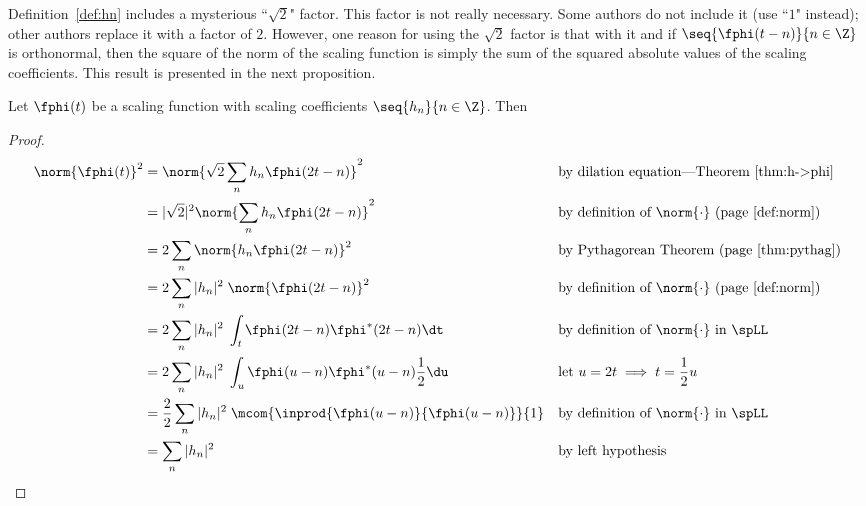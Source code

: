 Definition~\ref{def:hn} includes a mysterious ``$\sqrt{2}$" factor.
This factor is not really necessary.
Some authors do not include it (use ``$1$" instead);
other authors replace it with a factor of $2$.
However, one reason for using the $\sqrt{2}$ factor is that
with it and if $\seq{\fphi(t-n)}{n\in\Z}$ is orthonormal,
then the square of the norm of the scaling function is simply the
sum of the squared absolute values of the scaling coefficients.
This result is presented in the next proposition.
\begin{proposition}
Let $\fphi(t)$ be a scaling function with
scaling coefficients $\seq{ h_n }{n\in\Z}$. Then
\end{proposition}
\begin{proof}
\begin{align*}
  \norm{\fphi(t)}^2
    &= \norm{\sqrt{2}\sum_n  h_n \fphi(2t-n)}^2
    && \text{by dilation equation---Theorem~\ref{thm:h->phi}}
  \\&= |\sqrt{2}|^2 \norm{\sum_n  h_n \fphi(2t-n)}^2
    && \text{by definition of $\norm{\cdot}$ (page~\pageref{def:norm})}
  \\&= 2 \sum_n \norm{ h_n \fphi(2t-n)}^2
    && \text{by Pythagorean Theorem (page~\pageref{thm:pythag})}
  \\&= 2 \sum_n | h_n |^2 \; \norm{\fphi(2t-n)}^2
    && \text{by definition of $\norm{\cdot}$ (page~\pageref{def:norm})}
  \\&= 2 \sum_n | h_n |^2 \; \int_t \fphi(2t-n) \fphi^\ast(2t-n) \dt
    && \text{by definition of $\norm{\cdot}$ in $\spLL$}
  \\&= 2 \sum_n | h_n |^2 \; \int_u \fphi(u-n) \fphi^\ast(u-n) \frac{1}{2}\du
    && \text{let } u=2t \implies t=\frac{1}{2}u
  \\&= \frac{2}{2} \sum_n | h_n |^2 \; \mcom{\inprod{\fphi(u-n)}{\fphi(u-n)}}{1}
    && \text{by definition of $\norm{\cdot}$ in $\spLL$}
  \\&= \sum_n | h_n |^2
    && \text{by left hypothesis}
\end{align*}
\end{proof}



